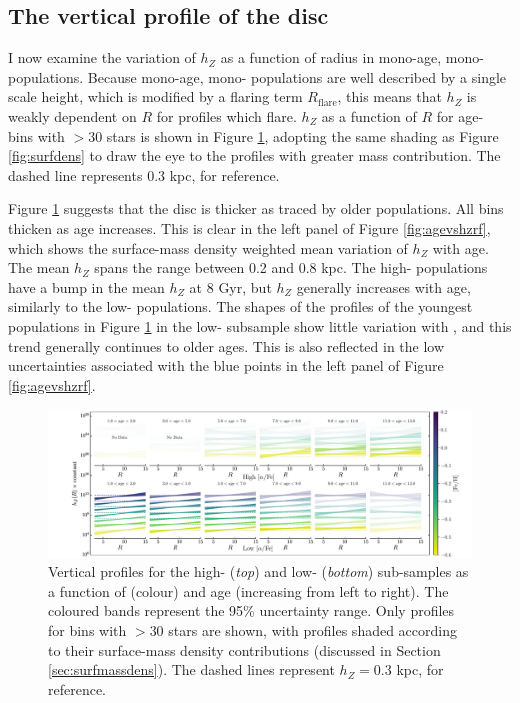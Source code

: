 \subsection{The vertical profile of the disc}
I now examine the variation of $h_Z$ as a function of radius in mono-age, mono-\feh{} populations. Because mono-age, mono-\feh{} populations are well described by a single scale height, which is modified by a flaring term $R_{\text{flare}}$, this means that $h_Z$ is weakly dependent on $R$ for profiles which flare. $h_Z$ as a function of $R$ for age-\feh{} bins with $> 30$ stars is shown in Figure \ref{fig:hzprofile}, adopting the same shading as Figure \ref{fig:surfdens} to draw the eye to the profiles with greater mass contribution. The dashed line represents $0.3$ kpc, for reference.

Figure \ref{fig:hzprofile} suggests that the disc is thicker as traced by older populations. All \feh{} bins thicken as age increases. This is clear in the left panel of Figure \ref{fig:agevshzrf}, which shows the surface-mass density weighted mean variation of $h_Z$ with age. The mean $h_Z$ spans the range between 0.2 and 0.8 kpc. The high-\afe{} populations have  a bump in the mean $h_Z$ at 8 Gyr, but $h_Z$ generally increases with age, similarly to the low-\afe{} populations. The shapes of the profiles of the youngest populations in Figure \ref{fig:hzprofile} in the low-\afe{} subsample show little variation with \feh{}, and this trend generally continues to older ages. This is also reflected in the low uncertainties associated with the blue points in the left panel of Figure \ref{fig:agevshzrf}. 


\begin{landscape}
 \begin{figure}
 	\includegraphics[width=1.\textwidth]{hz_profile_adjusted.pdf}
 	\centering
     \caption[Radial scale height profiles of mono-age, mono-\feh{} populations in the low and high-\afe{} disc components]{Vertical profiles for the high-\afe{} (\emph{top}) and low-\afe{} (\emph{bottom}) sub-samples as a function of \feh{} (colour) and age (increasing from left to right). The coloured bands represent the 95\% uncertainty range. Only profiles for bins with $> 30$ stars are shown, with profiles shaded according to their surface-mass density contributions (discussed in Section \ref{sec:surfmassdens}).  The dashed lines represent $h_Z = 0.3$ kpc, for reference.}
     \label{fig:hzprofile}
 \end{figure}
\end{landscape}


